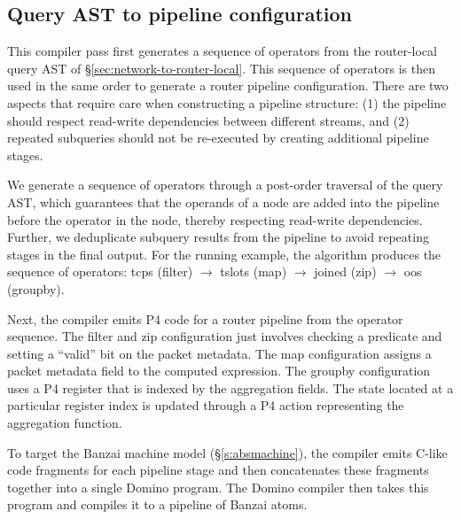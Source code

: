 \subsection{Query AST to pipeline configuration}
\label{sec:pipeline-layout}

This compiler pass first generates a sequence of operators from the
router-local query AST of \S\ref{sec:network-to-router-local}. This sequence of
operators is then used in the same order to generate a router pipeline
configuration. There are two aspects that require care when constructing a
pipeline structure: (1) the pipeline should respect read-write dependencies
between different streams, and (2) repeated subqueries should not be
re-executed by creating additional pipeline stages.

We generate a sequence of operators through a post-order traversal of the query
AST, which guarantees that the operands of a node are added into the pipeline
before the operator in the node, thereby respecting read-write dependencies.
Further, we deduplicate subquery results from the pipeline to avoid repeating
stages in the final output. For the running example, the algorithm produces the
sequence of operators: {\ct tcps} ({\ct filter}) $\rightarrow$ {\ct tslots}
({\ct map}) $\rightarrow$ {\ct joined} ({\ct zip}) $\rightarrow$ {\ct oos}
({\ct groupby}).

Next, the compiler emits P4 code for a router pipeline from the operator
sequence.  The {\ct filter} and {\ct zip} configuration just involves checking
a predicate and setting a ``valid'' bit on the packet metadata. The {\ct map}
configuration assigns a packet metadata field to the computed expression. The
{\ct groupby} configuration uses a P4 register that is indexed by the
aggregation fields. The state located at a particular register index is updated
through a P4 action representing the aggregation function.


To target the Banzai machine model (\S\ref{s:absmachine}), the \TheSystem
compiler emits C-like code fragments for each pipeline stage and then
concatenates these fragments together into a single Domino program. The Domino
compiler then takes this program and compiles it to a pipeline of Banzai atoms.
